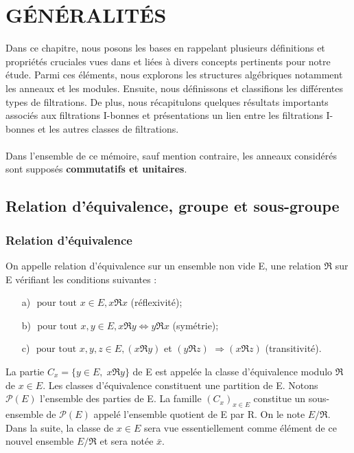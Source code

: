 \chapter{GÉNÉRALITÉS}
Dans ce chapitre, nous posons les bases en rappelant plusieurs définitions et propriétés cruciales vues dans \cite{Di2} et liées à divers concepts pertinents pour notre étude. Parmi ces éléments,
nous explorons les structures algébriques notamment les anneaux et les modules. Ensuite, nous définissons et classifions les différentes types de filtrations. De plus, nous récapitulons quelques résultats importants associés aux filtrations I-bonnes et présentations un lien entre les filtrations I-bonnes et les autres classes de filtrations. \\\\ Dans l'ensemble de ce mémoire, sauf mention contraire, les anneaux considérés sont supposés \textbf{commutatifs et unitaires}.
\section{Relation d'équivalence, groupe et sous-groupe}
\subsection{Relation d'équivalence}
\begin{madefinition}
	On appelle relation d’équivalence sur un ensemble non vide E, une relation
	$\Re $ sur E vérifiant les conditions suivantes :
	\begin{enumerate}
		\item[a)] $\text{ pour tout } x \in E, x\Re x$ (réflexivité);
		\item[b)] $\text{ pour tout } x,y \in E, x\Re y \Longleftrightarrow y\Re x $ (symétrie);
		\item[c)] $\text{ pour tout } x,y,z \in E, (x\Re y)$ et $(y\Re z)$ $\Longrightarrow (x\Re z)$  (transitivité).
	\end{enumerate}
	La partie $C_x = \{y \in E,\; x\Re y\}  $ de E est appelée la classe d’équivalence modulo $\Re $ de $x \in E$. Les	classes d’équivalence constituent une partition de E. Notons $\mathcal{P}(E)$ l’ensemble des parties de E. La famille $(C_x)_{x \in E}$ constitue un sous-ensemble de $\mathcal{P}(E)$ appelé l’ensemble quotient de E par R. On le note $E/\Re $. 
	Dans la suite, la classe de $x \in E$ sera vue essentiellement comme élément de ce nouvel ensemble $E/\Re $ et sera notée $\bar{x}$.
\end{madefinition}
